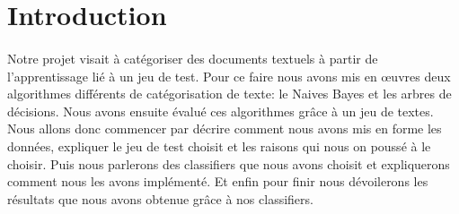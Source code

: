 \newpage
\section*{Introduction}
\paragraph{}
Notre projet visait à catégoriser des documents textuels à partir de l'apprentissage lié à un jeu de test.
Pour ce faire nous avons mis en œuvres deux algorithmes différents de catégorisation de texte: le Naives Bayes et les arbres de décisions.  Nous avons ensuite évalué ces algorithmes grâce à un jeu de textes.\\
Nous allons donc commencer par décrire comment nous avons mis en forme les données, expliquer le jeu de test choisit et les raisons qui nous on poussé à le choisir. Puis nous parlerons des classifiers que nous avons choisit et expliquerons comment nous les avons implémenté. Et enfin pour finir nous dévoilerons les résultats que nous avons obtenue grâce à nos classifiers.


\newpage